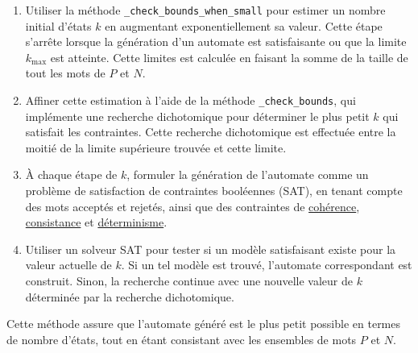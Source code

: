 \begin{enumerate}
    \item Utiliser la méthode \texttt{\_check\_bounds\_when\_small} pour estimer un nombre initial d'états \( k \) en augmentant exponentiellement sa valeur. Cette étape s'arrête lorsque la génération d'un automate est satisfaisante ou que la limite \( k_{\text{max}} \) est atteinte. Cette limites est calculée en faisant la somme de la taille de tout les mots de \( P \) et \( N \).
    
    \item Affiner cette estimation à l'aide de la méthode \texttt{\_check\_bounds}, qui implémente une recherche dichotomique pour déterminer le plus petit \( k \) qui satisfait les contraintes. Cette recherche dichotomique est effectuée entre la moitié de la limite supérieure trouvée et cette limite.

    \item À chaque étape de \( k \), formuler la génération de l'automate comme un problème de satisfaction de contraintes booléennes (SAT), en tenant compte des mots acceptés et rejetés, ainsi que des contraintes de \hyperref[cohérence]{cohérence}, \hyperref[consistance]{consistance} et \hyperref[determinisme]{déterminisme}.
    
    \item Utiliser un solveur SAT pour tester si un modèle satisfaisant existe pour la valeur actuelle de \( k \). Si un tel modèle est trouvé, l'automate correspondant est construit. Sinon, la recherche continue avec une nouvelle valeur de \( k \) déterminée par la recherche dichotomique.
\end{enumerate}

Cette méthode assure que l'automate généré est le plus petit possible en termes de nombre d'états, tout en étant consistant avec les ensembles de mots \( P \) et \( N \).